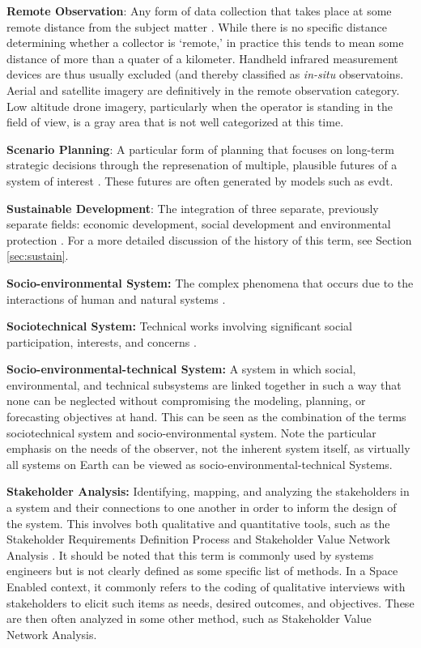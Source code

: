 \documentclass[notitlepage]{article}
\begin{document}
\textbf{Remote Observation}: Any form of data collection that takes place at some remote distance from the subject matter \cite{jensenRemoteSensingEnvironment2006}. While there is no specific distance determining whether a collector is `remote,' in practice this tends to mean some distance of more than a quater of a kilometer. Handheld infrared measurement devices are thus usually excluded (and thereby classified as \textit{in-situ} observatoins. Aerial and satellite imagery are definitively in the remote observation category. Low altitude drone imagery, particularly when the operator is standing in the field of view, is a gray area that is not well categorized at this time.

\textbf{Scenario Planning}: A particular form of planning that focuses on long-term strategic decisions through the represenation of multiple, plausible futures of a system of interest \cite{goodspeedScenarioPlanningCities2020}. These futures are often generated by models such as \ac{evdt}.

\textbf{Sustainable Development}: The integration of three separate, previously separate fields: economic development, social development and environmental protection \cite{worldsummitonsustainabledevelopmentPlanImplementationWorld2002}.  For a more detailed discussion of the history of this term, see Section \ref{sec:sustain}.

\textbf{Socio-environmental System:} The complex phenomena that occurs due to the interactions of human and natural systems \cite{elsawahEightGrandChallenges2020}.

\textbf{Sociotechnical System:} Technical works involving significant social participation, interests, and concerns \cite{maierArtSystemsArchitecting2009}.

\textbf{Socio-environmental-technical System:} A system in which social, environmental, and technical subsystems are linked together in such a way that none can be neglected without compromising the modeling, planning, or forecasting objectives at hand. This can be seen as the combination of the terms sociotechnical system and socio-environmental system. Note the particular emphasis on the needs of the observer, not the inherent system itself, as virtually all systems on Earth can be viewed as socio-environmental-technical Systems.

\textbf{Stakeholder Analysis:} Identifying, mapping, and analyzing the stakeholders in a system and their connections to one another in order to inform the design of the system. This involves both qualitative and quantitative tools, such as the Stakeholder Requirements Definition Process \cite{incoseINCOSESystemsEngineering2015} and Stakeholder Value Network Analysis \cite{fengDependencyStructureMatrix2010a}. It should be noted that this term is commonly used by systems engineers but is not clearly defined as some specific list of methods. In a Space Enabled context, it commonly refers to the coding of qualitative interviews with stakeholders to elicit such items as needs, desired outcomes, and objectives. These are then often analyzed in some other method, such as Stakeholder Value Network Analysis.
\end{document}
